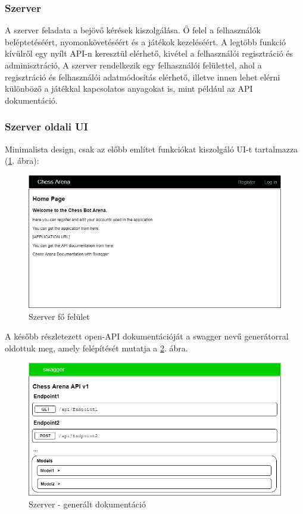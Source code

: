 \documentclass[twoside, a4paper, 12pt]{article}
\begin{document}
\subsubsection{Szerver}
A szerver feladata a bejövő kérések kiszolgálása. Ő felel a felhasználók beléptetéséért, nyomonkövetéséért és a játékok kezeléséért. A legtöbb funkció kívülről egy nyílt API-n keresztül elérhető, kivétel a felhasználói regisztráció és adminisztráció,
A szerver rendelkezik egy felhasználói felülettel, ahol a regisztráció és felhasználói adatmódosítás elérhető, illetve innen lehet elérni különböző a játékkal kapcsolatos anyagokat is, mint például az API dokumentáció.

\subsubsection{Szerver oldali UI}
Minimalista design, csak az előbb említet funkciókat kiszolgáló UI-t tartalmazza (\ref{fig:serverUiMainScreen}. ábra):

\begin{figure}[htbp]
	\centering
	\includegraphics[width=1.0\textwidth]{img/serverUiMainScreen.png}
	\caption{Szerver fő felület}
	\label{fig:serverUiMainScreen}
\end{figure}

A később részletezett open-API dokumentációját a swagger nevű generátorral oldottuk meg, amely felépítését mutatja a \ref{fig:serverUiDocumentation}. ábra.

\begin{figure}[htbp]
	\centering
	\includegraphics[width=1.0\textwidth]{img/serverUiDocumentation.png}
	\caption{Szerver - generált dokumentáció}
	\label{fig:serverUiDocumentation}
\end{figure}
\end{document}
